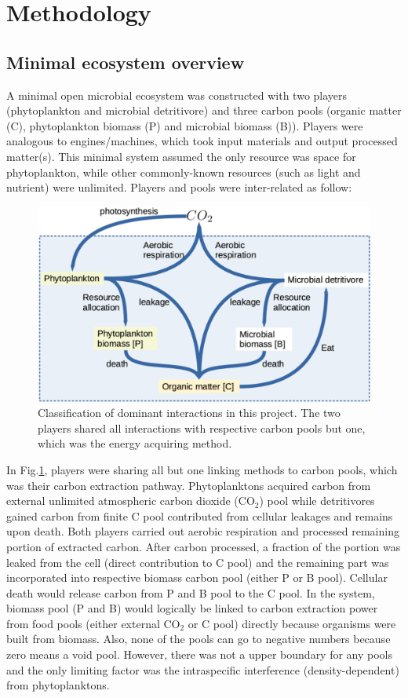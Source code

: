 \documentclass[../thesis.tex]{subfiles} %
\begin{document}
\section{Methodology}
\subsection{Minimal ecosystem overview}
A minimal open microbial ecosystem was constructed with two players (phytoplankton and microbial detritivore) and three carbon pools (organic matter (C), phytoplankton biomass (P) and microbial biomass (B)).  Players were analogous to engines/machines, which took input materials and output processed matter(s).  This minimal system assumed the only resource was space for phytoplankton, while other commonly-known resources (such as light and nutrient) were unlimited.  Players and pools were inter-related as follow:

\begin{figure}[H]
    \centering
    \includegraphics[width=.8\linewidth]{result/model.png}
    \caption[Model visualization]{Classification of dominant interactions in this project.  The two players shared all interactions with respective carbon pools but one, which was the energy acquiring method.}
    \label{modelInWord}
\end{figure}

In Fig.\ref{modelInWord}, players were sharing all but one linking methods to carbon pools, which was their carbon extraction pathway.  Phytoplanktons acquired carbon from external unlimited atmospheric carbon dioxide (CO$_2$) pool while detritivores gained carbon from finite C pool contributed from cellular leakages and remains upon death.  Both players carried out aerobic respiration and processed remaining portion of extracted carbon.  After carbon processed, a fraction of the portion was leaked from the cell (direct contribution to C pool) and the remaining part was incorporated into respective biomass carbon pool (either P or B pool).  Cellular death would release carbon from P and B pool to the C pool.  In the system, biomass pool (P and B) would logically be linked to carbon extraction power from food pools (either external CO$_2$ or C pool) directly because organisms were built from biomass.  Also, none of the pools can go to negative numbers because zero means a void pool.  However, there was not a upper boundary for any pools and the only limiting factor was the intraspecific interference (density-dependent) from phytoplanktons.
\end{document}
